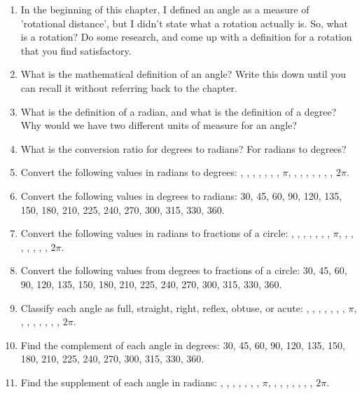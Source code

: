 \begin{enumerate}
\item {In the beginning of this chapter, I defined an angle as a measure of 'rotational distance', but I didn't state what a rotation actually is.  So, what is a rotation?  Do some research, and come up with a definition for a rotation that you find satisfactory.}

\item{What is the mathematical definition of an angle?  Write this down until you can recall it without referring back to the chapter.}

\item{What is the definition of a radian, and what is the definition of a degree?  Why would we have two different units of measure for an angle?}

\item{What is the conversion ratio for degrees to radians?  For radians to degrees?}

\item{Convert the following values in radians to degrees: \pisix, \pifour, \pithree, \pitwo, \twopithree, \threepifour, \fivepisix, $\pi$, \sevenpisix, \fivepifour, \fourpithree, \threepitwo, \fivepithree, \sevenpifour, \elevenpisix, $2\pi$.}

\item{Convert the following values in degrees to radians: 30, 45, 60, 90, 120, 135, 150, 180, 210, 225, 240, 270, 300, 315, 330, 360.}

\item{Convert the following values in radians to fractions of a circle:  \pisix, \pifour, \pithree, \pitwo, \twopithree, \threepifour, \fivepisix, $\pi$, \sevenpisix, \fivepifour, \fourpithree, \threepitwo, \fivepithree, \sevenpifour, \elevenpisix, $2\pi$.}

\item{Convert the following values from degrees to fractions of a circle: 30, 45, 60, 90, 120, 135, 150, 180, 210, 225, 240, 270, 300, 315, 330, 360.}

\item{Classify each angle as full, straight, right, reflex, obtuse, or acute:  \pisix, \pifour, \pithree, \pitwo, \twopithree, \threepifour, \fivepisix, $\pi$, \sevenpisix, \fivepifour, \fourpithree, \threepitwo, \fivepithree, \sevenpifour, \elevenpisix, $2\pi$.}

\item{Find the complement of each angle in degrees: 30, 45, 60, 90, 120, 135, 150, 180, 210, 225, 240, 270, 300, 315, 330, 360.}

\item{Find the supplement of each angle in radians:  \pisix, \pifour, \pithree, \pitwo, \twopithree, \threepifour, \fivepisix, $\pi$, \sevenpisix, \fivepifour, \fourpithree, \threepitwo, \fivepithree, \sevenpifour, \elevenpisix, $2\pi$.}

\end{enumerate}
